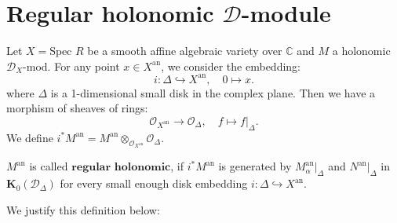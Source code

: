 \section{Regular holonomic $\mathcal{D}$-module}\label{sec:regular-holonomic-d-module}

Let $X = \text{Spec } R$ be a smooth affine algebraic variety over $\mathbb{C}$ and $M$ a holonomic $\mathcal{D}_X$-mod.
For any point $x \in X^{\mathrm{an}}$, we consider the embedding:
$$
    i: \Delta \hookrightarrow X^{\mathrm{an}}, \quad 0 \mapsto x.
$$
where $\Delta$ is a 1-dimensional small disk in the complex plane.
Then we have a morphism of sheaves of rings:
$$
    \mathcal{O}_{X^{\mathrm{an}}} \to \mathcal{O}_{\Delta}, \quad f \mapsto f|_{\Delta}.
$$
We define $i^*M^{\mathrm{an}} = M^{\mathrm{an}} \otimes_{\mathcal{O}_{X^{\mathrm{an}}}} \mathcal{O}_{\Delta}$.

\begin{definition}\label{def:analytic_regular_holmonicity}
    \mbox{}

    $M^{\mathrm{an}}$ is called $\textbf{regular holonomic}$, if $i^{\ast}M^{\mathrm{an}}$ is generated by $M_{\alpha}^{\mathrm{an}}|_{\Delta}$ and $N^{\mathrm{an}}|_{\Delta}$ in $\mathbf{K}_{0}(\mathcal{D}_{\Delta})$ for every small enough disk embedding $i:\Delta \hookrightarrow X^{\mathrm{an}}$.
\end{definition}

\bigskip

We justify this definition below:

